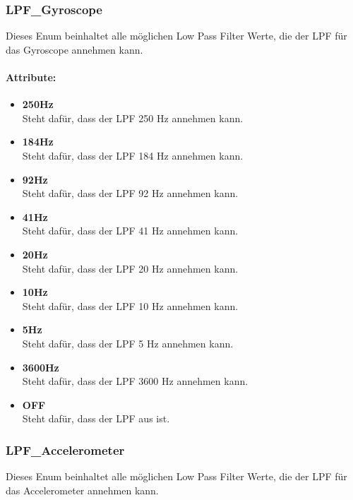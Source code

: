 \documentclass[a4paper,12pt]{article}
\begin{document}
\subsubsection{LPF\_Gyroscope}
Dieses Enum beinhaltet alle möglichen Low Pass Filter Werte, die der LPF für das Gyroscope annehmen kann.

\paragraph{Attribute:}
\begin{itemize}
	\item \textbf{250Hz}\\Steht dafür, dass der LPF 250 Hz annehmen kann.
	\item \textbf{184Hz}\\Steht dafür, dass der LPF 184 Hz annehmen kann.
	\item \textbf{92Hz}\\Steht dafür, dass der LPF 92 Hz annehmen kann.
	\item \textbf{41Hz}\\Steht dafür, dass der LPF 41 Hz annehmen kann.
	\item \textbf{20Hz}\\Steht dafür, dass der LPF 20 Hz annehmen kann.
	\item \textbf{10Hz}\\Steht dafür, dass der LPF 10 Hz annehmen kann.
	\item \textbf{5Hz}\\Steht dafür, dass der LPF 5 Hz annehmen kann.
	\item \textbf{3600Hz}\\Steht dafür, dass der LPF 3600 Hz annehmen kann.
	\item \textbf{OFF}\\Steht dafür, dass der LPF aus ist.
\end{itemize}


\subsubsection{LPF\_Accelerometer}
Dieses Enum beinhaltet alle möglichen Low Pass Filter Werte, die der LPF für das Accelerometer annehmen kann.
\end{document}
